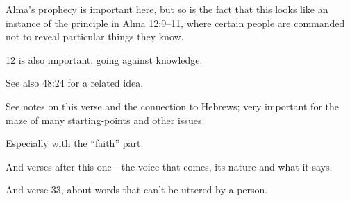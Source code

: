 \begin{compactdesc}
				\begin{compactitem}
					\item Alma's prophecy is important here, but so is the fact that this looks like an instance of the principle in Alma 12:9--11, where certain people are commanded not to reveal particular things they know.
					\item 12 is also important, going against knowledge.
				\end{compactitem} 
			\item[{\hyperref[ALMA-46-8]{Alma 46:8--9}}]
			\item[{\hyperref[ALMA-47-36]{Alma 47:36}}] \phantom{.}
				\begin{compactitem}
					\item See also 48:24 for a related idea.
				\end{compactitem}
			\item[{\hyperref[ALMA-48-11]{Alma 48:11}}]
			\item[{\hyperref[ALMA-49-30]{Alma 49:30}}]
			\item[{\hyperref[ALMA-55-1]{Alma 55:1}}]
			\item[{\hyperref[ALMA-57-21]{Alma 57:21}}]
			\item[{\hyperref[HELAMAN-3-29]{Helaman 3:29}}] \phantom{.}
				\begin{compactitem}
					\item See notes on this verse and the connection to Hebrews; very important for the maze of many starting-points and other issues.
				\end{compactitem} 
			\item[{\hyperref[HELAMAN-3-35]{Helaman 3:35}}] \phantom{.}
				\begin{compactitem}
					\item Especially with the ``faith'' part.
				\end{compactitem}
			\item[{\hyperref[HELAMAN-4-12]{Helaman 4:12--13}}]
			\item[{\hyperref[HELAMAN-4-20]{Helaman 4:20--26}}]
			\item[{\hyperref[HELAMAN-5-17]{Helaman 5:17--18}}]
			\item[{\hyperref[HELAMAN-5-29]{Helaman 5:29}}] \phantom{.}
				\begin{compactitem}
					\item And verses after this one---the voice that comes, its nature and what it says.
					\item And verse 33, about words that can't be uttered by a person.

\end{compactitem}
\end{compactdesc}
